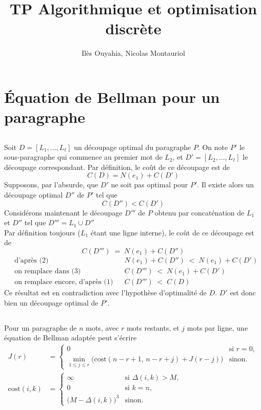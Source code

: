 \documentclass[10pt]{article}
\title{TP Algorithmique et optimisation discrète}
\author{Ilès Ouyahia, Nicolas Montauriol}
\date{}
\begin{document}
\maketitle
\vspace{-.75cm}
\section{Équation de Bellman pour un paragraphe}

\subsection{}
Soit $D=[L_1,\ldots,L_\ell]$ un découpage optimal du paragraphe $P$. On note $P'$ le sous-paragraphe qui commence au premier mot de $L_2$, et $D'=[L_2,\ldots,L_\ell]$ le découpage correspondant. Par définition, le coût de ce découpage est de
\[
C(D)=N(e_1)+C(D')
\tag{1}
\]
Supposons, par l'absurde, que $D'$ ne soit pas optimal pour $P'$. Il existe alors un découpage optimal $D''$ de $P'$ tel que
\[
C(D'')<C(D')
\tag{2}
\]
Considérons maintenant le découpage $D'''$ de $P$ obtenu par concaténation de $L_1$ et $D''$ tel que $D''' = L_1 \cup D''$ \\
Par définition toujours ($L_1$ étant une ligne interne), le coût de ce découpage est de
\[
C(D''') \;=\; N(e_1)+C(D'')
\tag{3}
\]
\begin{align*}
&\text{d'après (2)} && N(e_1) + C(D'') \;<\; N(e_1) + C(D') \\
&\text{on remplace dans (3)} && C(D''') \;<\; N(e_1) + C(D') \\
&\text{on remplace encore, d'après (1)} && C(D''') \;<\; C(D)
\end{align*}
Ce résultat est en contradiction avec l'hypothèse d'optimalité de $D$. $D'$ est donc bien un découpage optimal de $P'$.

\subsection{}
Pour un paragraphe de \(n\) mots, avec \(r\) mots restants, et \(j\) mots par ligne, une équation de Bellman adaptée peut s'écrire
\[
\begin{aligned}
J(r) &=
\begin{cases}
0 & \text{si } r=0,\\[4pt]
\displaystyle \min_{1 \le j \le r}\Big( \mathrm{cost}(n-r+1,\,n-r+j) + J(r-j) \Big) & \text{sinon.}
\end{cases}\\[8pt]
\mathrm{cost}(i,k) &=
\begin{cases}
\infty & \text{si } \Delta(i,k) > M,\\
0 & \text{si } k = n,\\
\big(M - \Delta(i,k)\big)^3 & \text{sinon.}
\end{cases}
\end{aligned}
\]
\end{document}
